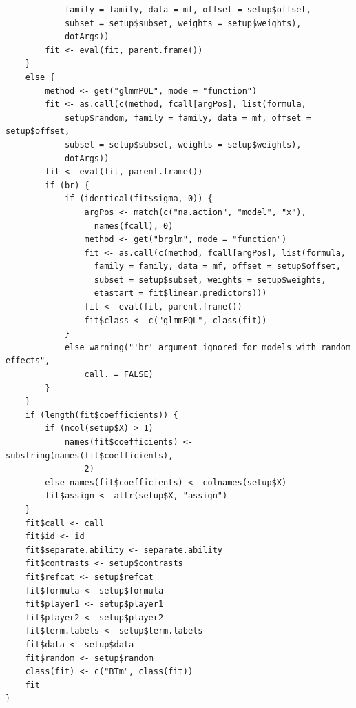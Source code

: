 \documentclass[11pt,a4paper]{article}
\begin{document}
\begin{lstlisting}
            family = family, data = mf, offset = setup$offset, 
            subset = setup$subset, weights = setup$weights), 
            dotArgs))
        fit <- eval(fit, parent.frame())
    }
    else {
        method <- get("glmmPQL", mode = "function")
        fit <- as.call(c(method, fcall[argPos], list(formula, 
            setup$random, family = family, data = mf, offset = setup$offset, 
            subset = setup$subset, weights = setup$weights), 
            dotArgs))
        fit <- eval(fit, parent.frame())
        if (br) {
            if (identical(fit$sigma, 0)) {
                argPos <- match(c("na.action", "model", "x"), 
                  names(fcall), 0)
                method <- get("brglm", mode = "function")
                fit <- as.call(c(method, fcall[argPos], list(formula, 
                  family = family, data = mf, offset = setup$offset, 
                  subset = setup$subset, weights = setup$weights, 
                  etastart = fit$linear.predictors)))
                fit <- eval(fit, parent.frame())
                fit$class <- c("glmmPQL", class(fit))
            }
            else warning("'br' argument ignored for models with random effects", 
                call. = FALSE)
        }
    }
    if (length(fit$coefficients)) {
        if (ncol(setup$X) > 1) 
            names(fit$coefficients) <- substring(names(fit$coefficients), 
                2)
        else names(fit$coefficients) <- colnames(setup$X)
        fit$assign <- attr(setup$X, "assign")
    }
    fit$call <- call
    fit$id <- id
    fit$separate.ability <- separate.ability
    fit$contrasts <- setup$contrasts
    fit$refcat <- setup$refcat
    fit$formula <- setup$formula
    fit$player1 <- setup$player1
    fit$player2 <- setup$player2
    fit$term.labels <- setup$term.labels
    fit$data <- setup$data
    fit$random <- setup$random
    class(fit) <- c("BTm", class(fit))
    fit
}
\end{lstlisting}
\end{document}
